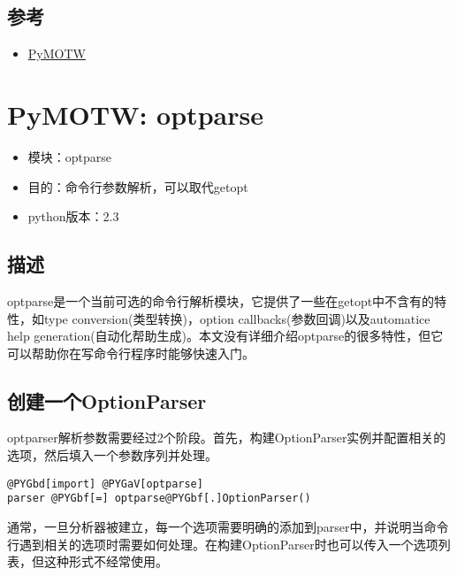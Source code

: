 \documentclass[letterpaper,10pt,english]{manual}
\begin{document}
\subsection{参考}
\begin{itemize}
\item {} 
\href{http://http://tc-nsop-test2.tc.baidu.com:3129/documents}{PyMOTW}

\end{itemize}

\resetcurrentobjects


\section{PyMOTW: optparse}
\begin{itemize}
\item {} 
模块：optparse

\item {} 
目的：命令行参数解析，可以取代getopt

\item {} 
python版本：2.3

\end{itemize}


\subsection{描述}

optparse是一个当前可选的命令行解析模块，它提供了一些在getopt中不含有的特性，如type conversion(类型转换)，option callbacks(参数回调)以及automatice help generation(自动化帮助生成)。本文没有详细介绍optparse的很多特性，但它可以帮助你在写命令行程序时能够快速入门。


\subsection{创建一个OptionParser}

optparser解析参数需要经过2个阶段。首先，构建OptionParser实例并配置相关的选项，然后填入一个参数序列并处理。

\begin{Verbatim}[commandchars=@\[\]]
@PYGbd[import] @PYGaV[optparse]
parser @PYGbf[=] optparse@PYGbf[.]OptionParser()
\end{Verbatim}

通常，一旦分析器被建立，每一个选项需要明确的添加到parser中，并说明当命令行遇到相关的选项时需要如何处理。在构建OptionParser时也可以传入一个选项列表，但这种形式不经常使用。
\end{document}
